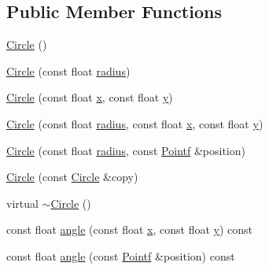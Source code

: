 \subsection*{Public Member Functions}
\begin{DoxyCompactItemize}
\item 
\hyperlink{classprism_1_1geometry_1_1_circle_a7d9e34947cf139b50f5730ed7711b4a4}{Circle} ()
\item 
\hyperlink{classprism_1_1geometry_1_1_circle_af92464e3c8e28c5057092c241b6c6dfe}{Circle} (const float \hyperlink{classprism_1_1geometry_1_1_circle_aef97382c1f0b09dca59a0534ac03ed1b}{radius})
\item 
\hyperlink{classprism_1_1geometry_1_1_circle_a7f9bb5688959d0ea323a88b5e287dd36}{Circle} (const float \hyperlink{classprism_1_1geometry_1_1_circle_aeb38df0ed8d1b3b84c4eb42b50a05348}{x}, const float \hyperlink{classprism_1_1geometry_1_1_circle_aea5997071a76ee672b6b7ec0908ebe11}{y})
\item 
\hyperlink{classprism_1_1geometry_1_1_circle_ae9b063ea2b20cf9056ff0235f7c03fc1}{Circle} (const float \hyperlink{classprism_1_1geometry_1_1_circle_aef97382c1f0b09dca59a0534ac03ed1b}{radius}, const float \hyperlink{classprism_1_1geometry_1_1_circle_aeb38df0ed8d1b3b84c4eb42b50a05348}{x}, const float \hyperlink{classprism_1_1geometry_1_1_circle_aea5997071a76ee672b6b7ec0908ebe11}{y})
\item 
\hyperlink{classprism_1_1geometry_1_1_circle_a5163ce7077d3e55bf0208f4b85365bda}{Circle} (const float \hyperlink{classprism_1_1geometry_1_1_circle_aef97382c1f0b09dca59a0534ac03ed1b}{radius}, const \hyperlink{classprism_1_1geometry_1_1_pointf}{Pointf} \&position)
\item 
\hyperlink{classprism_1_1geometry_1_1_circle_ac2d59157d370b6675066f17b53855b64}{Circle} (const \hyperlink{classprism_1_1geometry_1_1_circle}{Circle} \&copy)
\item 
virtual \hyperlink{classprism_1_1geometry_1_1_circle_afc9d1b6ca5fff7749f06baacaf4e4a76}{$\sim$\+Circle} ()
\item 
const float \hyperlink{classprism_1_1geometry_1_1_circle_a48b7121373194162c3268247213e4dc4}{angle} (const float \hyperlink{classprism_1_1geometry_1_1_circle_aeb38df0ed8d1b3b84c4eb42b50a05348}{x}, const float \hyperlink{classprism_1_1geometry_1_1_circle_aea5997071a76ee672b6b7ec0908ebe11}{y}) const 
\item 
const float \hyperlink{classprism_1_1geometry_1_1_circle_abdc96ede803eb3a37d5a09559bcf3953}{angle} (const \hyperlink{classprism_1_1geometry_1_1_pointf}{Pointf} \&position) const 

\end{DoxyCompactItemize}
